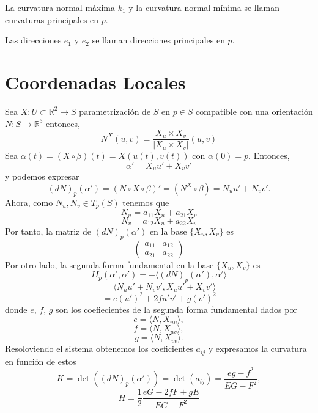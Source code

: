 \begin{defn}
  La curvatura normal máxima $k_{1}$ y la curvatura normal mínima se llaman curvaturas principales en $p$.
\end{defn}

\begin{defn}
   Las direcciones $e_{1}$ y $e_{2}$ se llaman direcciones principales en $p$.
\end{defn}

\section{Coordenadas Locales}

\begin{note}
  Sea $X : U \subset \mathbb{R}^{2} \to S$ parametrización de $S$ en $p \in S$ compatible con una orientación $N : S \to \mathbb{R}^{3}$ entonces,
  \[ 
    N^{X}(u,v) = \frac{X_{u} \times X_{v}}{| X_{u} \times X_{v} |}(u,v)
  \] 
  Sea $\alpha(t) = (X \circ \beta)(t) = X(u(t),v(t))$ con $\alpha(0) = p$. Entonces,
  \[ 
    \alpha' = X_{u} u' + X_{v} v' 
  \] 
  y podemos expresar
  \[ 
    (d N)_{p}(\alpha') = (N \circ X \circ \beta)' = (N^{X} \circ \beta)= N_{u} u' + N_{v} v' .
  \] 
  Ahora, como $N_{u}, N_{v} \in T_{p}(S)$ tenemos que
  \[ 
    N_{u} = a_{11} X_{u} + a_{21} X_{v} 
  \] 
  \[ 
    N_{v} = a_{12} X_{u} + a_{22} X_{v} 
  \] 
  Por tanto, la matriz de $(d N)_{p}(\alpha')$ en la base $\{ X_{u}, X_{v} \}$ es
  \[ 
    \begin{pmatrix}
       a_{11} & a_{12} \\
       a_{21} & a_{22}
    \end{pmatrix}
  \] 
  Por otro lado, la segunda forma fundamental en la base $\{ X_{u}, X_{v} \}$ es 
  \[ 
    II_{p}(\alpha', \alpha') = - \langle (d N)_{p}(\alpha'){ , }\alpha' \rangle
  \] 
  \[ 
    = \langle N_{u}u' + N_{v} v'{ , }X_{u} u' + X_{v} v' \rangle 
  \] 
  \[ 
    = e(u')^{2} + 2 f u' v' + g(v')^{2} 
  \] 
  donde $e$, $f$, $g$ son los coefiecientes de la segunda forma fundamental dados por
  \[ 
    e = \langle N{ , }X_{uu} \rangle, 
  \] 
  \[ 
    f = \langle N{ , }X_{uv} \rangle,
  \] 
  \[ 
    g = \langle N{ , }X_{vv} \rangle.
  \] 
  Resoloviendo el sistema obtenemos los coeficientes $a_{ij}$ y expresamos la curvatura en función de estos
  \[ 
    K = \det((d N)_{p}(\alpha')) = \det(a_{ij}) = \frac{eg - f^{2}}{EG - F^{2}},
  \] 
  \[ 
    H = \frac{1}{2} \frac{eG - 2fF + gE}{EG - F^2} 
  \] 
\end{note}

